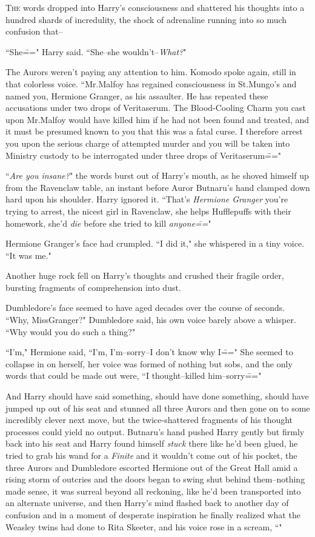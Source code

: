 
\lettrine{T}{he} words dropped into Harry's consciousness and shattered his thoughts into a hundred shards of incredulity, the shock of adrenaline running into so much confusion that\---

``She\===" Harry said. ``She\---she wouldn't\---\emph{What?}"

The Aurors weren't paying any attention to him. Komodo spoke again, still in that colorless voice. ``Mr.\?Malfoy has regained consciousness in St.\?Mungo's and named you, Hermione Granger, as his assaulter. He has repeated these accusations under two drops of Veritaserum. The Blood-Cooling Charm you cast upon Mr.\?Malfoy would have killed him if he had not been found and treated, and it must be presumed known to you that this was a fatal curse. I therefore arrest you upon the serious charge of attempted murder and you will be taken into Ministry custody to be interrogated under three drops of Veritaserum\==="

``\emph{Are you insane?}" the words burst out of Harry's mouth, as he shoved himself up from the Ravenclaw table, an instant before Auror Butnaru's hand clamped down hard upon his shoulder. Harry ignored it. ``That's \emph{Hermione Granger} you're trying to arrest, the nicest girl in Ravenclaw, she helps Hufflepuffs with their homework, she'd \emph{die} before she tried to kill \emph{anyone\===}"

Hermione Granger's face had crumpled. ``I did it," she whispered in a tiny voice. ``It was me."

Another huge rock fell on Harry's thoughts and crushed their fragile order, bursting fragments of comprehension into dust.

Dumbledore's face seemed to have aged decades over the course of seconds. ``Why, Miss\?Granger?" Dumbledore said, his own voice barely above a whisper. ``Why would you do such a thing?"

``I'm," Hermione said, ``I'm, I'm\---sorry\---I don't know why I\===" She seemed to collapse in on herself, her voice was formed of nothing but sobs, and the only words that could be made out were, ``I thought\---killed him\---sorry\==="

And Harry should have said something, should have done something, should have jumped up out of his seat and stunned all three Aurors and then gone on to some incredibly clever next move, but the twice-shattered fragments of his thought processes could yield no output. Butnaru's hand pushed Harry gently but firmly back into his seat and Harry found himself \emph{stuck} there like he'd been glued, he tried to grab his wand for a \emph{Finite} and it wouldn't come out of his pocket, the three Aurors and Dumbledore escorted Hermione out of the Great Hall amid a rising storm of outcries and the doors began to swing shut behind them\---nothing made sense, it was surreal beyond all reckoning, like he'd been transported into an alternate universe, and then Harry's mind flashed back to another day of confusion and in a moment of desperate inspiration he finally realized what the Weasley twins had done to Rita Skeeter, and his voice rose in a scream, ``"

